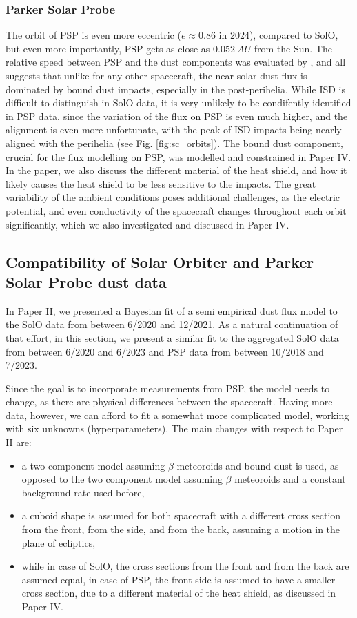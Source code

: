 \subsubsection{Parker Solar Probe}

The orbit of PSP is even more eccentric ($e \approx 0.86$ in 2024), compared to SolO, but even more importantly, PSP gets as close as $\SI{0.052}{AU}$ from the Sun. The relative speed between PSP and the dust components was evaluated by \citet{szalay2020near}, and all suggests that unlike for any other spacecraft, the near-solar dust flux is dominated by bound dust impacts, especially in the post-perihelia. While ISD is difficult to distinguish in SolO data, it is very unlikely to be condifently identified in PSP data, since the variation of the flux on PSP is even much higher, and the alignment is even more unfortunate, with the peak of ISD impacts being nearly aligned with the perihelia (see Fig. \ref{fig:sc_orbits}). The bound dust component, crucial for the flux modelling on PSP, was modelled and constrained in Paper IV. In the paper, we also discuss the different material of the heat shield, and how it likely causes the heat shield to be less sensitive to the impacts. The great variability of the ambient conditions poses additional challenges, as the electric potential, and even conductivity of the spacecraft changes throughout each orbit significantly, which we also investigated and discussed in Paper IV.

\subsection{Compatibility of Solar Orbiter and Parker Solar Probe dust data}

In Paper II, we presented a Bayesian fit of a semi empirical dust flux model to the SolO data from between 6/2020 and 12/2021. As a natural continuation of that effort, in this section, we present a similar fit to the aggregated SolO data from between 6/2020 and 6/2023 and PSP data from between 10/2018 and 7/2023. 

Since the goal is to incorporate measurements from PSP, the model needs to change, as there are physical differences between the spacecraft. Having more data, however, we can afford to fit a somewhat more complicated model, working with six unknowns (hyperparameters). The main changes with respect to Paper II are:
\begin{itemize}
    \item a two component model assuming $\beta$ meteoroids and bound dust is used, as opposed to the two component model assuming $\beta$ meteoroids and a constant background rate used before,
    \item a cuboid shape is assumed for both spacecraft with a different cross section from the front, from the side, and from the back, assuming a motion in the plane of ecliptics, 
    \item while in case of SolO, the cross sections from the front and from the back are assumed equal, in case of PSP, the front side is assumed to have a smaller cross section, due to a different material of the heat shield, as discussed in Paper IV.
\end{itemize}

